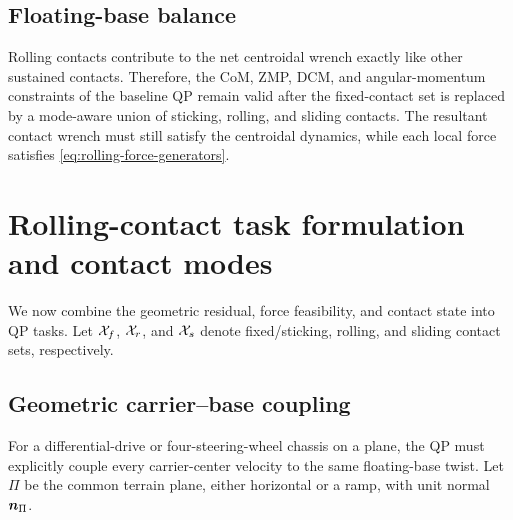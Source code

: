 \documentclass[10pt]{article}
\begin{document}
\subsection{Floating-base balance}

Rolling contacts contribute to the net centroidal wrench exactly like other
sustained contacts. Therefore, the CoM, ZMP, DCM, and angular-momentum
constraints of the baseline QP remain valid after the fixed-contact set is
replaced by a mode-aware union of sticking, rolling, and sliding contacts. The
resultant contact wrench must still satisfy the centroidal dynamics, while
each local force satisfies \eqref{eq:rolling-force-generators}.


\section{Rolling-contact task formulation and contact modes}
\label{sec:rolling-tasks}

We now combine the geometric residual, force feasibility, and contact state
into QP tasks. Let $\mathcal{X}_{f}$, $\mathcal{X}_{r}$, and $\mathcal{X}_{s}$ denote fixed/sticking,
rolling, and sliding contact sets, respectively.

\subsection{Geometric carrier--base coupling}
\label{sec:carrier-base-coupling}

For a differential-drive or four-steering-wheel chassis on a plane, the QP
must explicitly couple every carrier-center velocity to the same
floating-base twist. Let $\Pi$ be the common terrain plane, either horizontal
or a ramp, with unit normal $\boldsymbol{n}_{\Pi}$.
\end{document}
